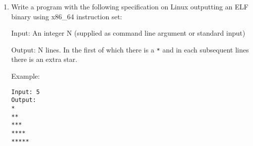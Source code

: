\begin{enumerate}
  \item Write a program with the following specification on Linux outputting an
    ELF binary using x86\_64 instruction set:

    Input: An integer N (supplied as command line argument or standard input)

    Output: N lines. In the first of which there is a \texttt{*} and in each
    subsequent lines there is an extra star.

    Example:
    \begin{verbatim}
Input: 5
Output:
*
**
***
****
*****
    \end{verbatim}

\end{enumerate}


